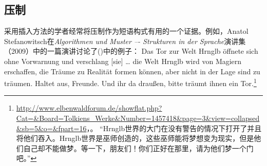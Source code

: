 \subsection{压制}
\label{coercion-sec}
    采用插入方法的学者经常将压制作为短语构式有用的一个证据。例如，Anatol Stefanowitsch在\emph{Algorithmen und Muster –-
  Strukturen in der Sprache}演讲集（2009）中的一篇演讲讨论了()中的例子：\ea
Das Tor zur Welt Hrnglb öffnete sich ohne Vorwarnung
und verschlang [sie] \ldots{} die Welt Hrnglb wird von Magiern
erschaffen, die Träume zu Realität formen können, aber
nicht in der Lage sind zu träumen. Haltet aus, Freunde.
Und ihr da draußen, bitte träumt ihnen ein Tor.\footnote{%
\url{http://www.elbenwaldforum.de/showflat.php?Cat=&Board=Tolkiens_Werke&Number=1457418&page=3&view=collapsed&sb=5&o=&fpart=16}，。
“Hrnglb世界的大门在没有警告的情况下打开了并且将他们吞入。Hrnglb世界是巫师创造的，这些巫师能将梦想变为现实，但是他们自己却不能做梦。等一下，朋友们！你们正好在那里，请为他们梦一个门吧。”
}
\z

